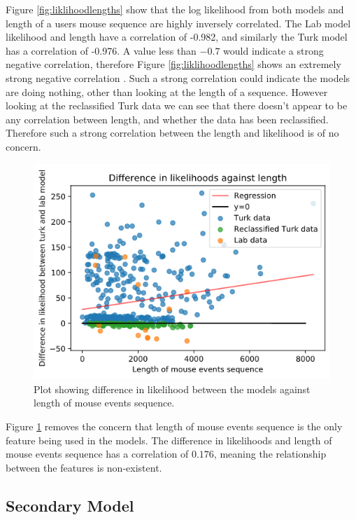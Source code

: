 \documentclass{article}
\begin{document}
Figure \ref{fig:liklihoodlengths} show that the log likelihood from both models and length of a users mouse sequence are highly inversely correlated. 
The Lab model likelihood and length have a correlation of -0.982, and similarly the Turk model has a correlation of -0.976.
A value less than $-0.7$ would indicate a strong negative correlation, therefore Figure \ref{fig:liklihoodlengths} shows an extremely strong negative correlation \cite{mindrila2017scatterplots}.
Such a strong correlation could indicate the models are doing nothing, other than looking at the length of a sequence.
However looking at the reclassified Turk data we can see that there doesn't appear to be any correlation between length, and whether the data has been reclassified.
Therefore such a strong correlation between the length and likelihood is of no concern. 

\begin{figure}[ht!]
    \centering
    \includegraphics[scale=0.5]{Images/Difference-Liklihood-Length.png}
    \caption{Plot showing difference in likelihood between the models against length of mouse events sequence. }
    \label{fig:diffliklihoodlengths}
\end{figure}

Figure \ref{fig:diffliklihoodlengths} removes the concern that length of mouse events sequence is the only feature being used in the models.
The difference in likelihoods and length of mouse events sequence has a correlation of $0.176$, meaning the relationship between the features is non-existent.

\subsection{Secondary Model}    %
\end{document}
